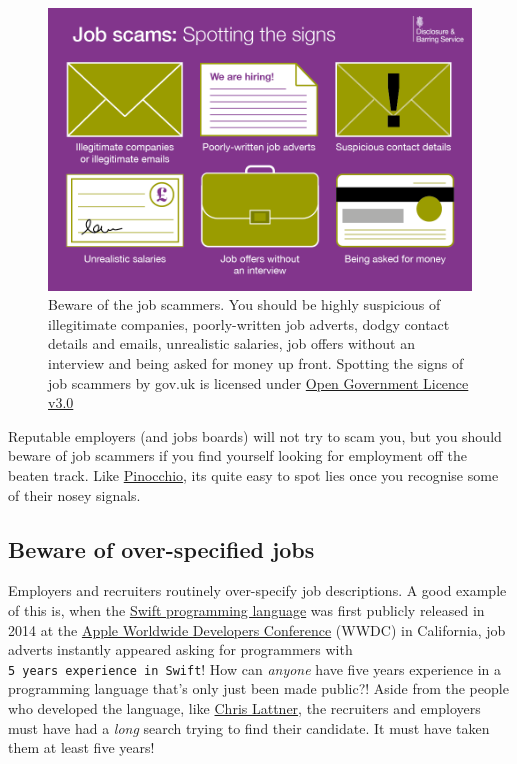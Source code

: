 \documentclass[
]{book}
\begin{document}
\begin{figure}

{\centering \includegraphics[width=0.98\linewidth]{images/Job-Scams-Signs-GOVUK} 

}

\caption{Beware of the job scammers. You should be highly suspicious of illegitimate companies, poorly-written job adverts, dodgy contact details and emails, unrealistic salaries, job offers without an interview and being asked for money up front. Spotting the signs of job scammers by gov.uk is licensed under \href{https://www.nationalarchives.gov.uk/doc/open-government-licence/version/3/}{Open Government Licence v3.0} \citep{jobscammers2}}\label{fig:jobscams-fig}
\end{figure}



Reputable employers (and jobs boards) will not try to scam you, but you should beware of job scammers if you find yourself looking for employment off the beaten track. Like \href{https://en.wikipedia.org/wiki/Pinocchio}{Pinocchio}, its quite easy to spot lies once you recognise some of their nosey signals. 🤥

\hypertarget{overspec}{%
\subsection{Beware of over-specified jobs}\label{overspec}}

Employers and recruiters routinely over-specify job descriptions. A good example of this is, when the \href{https://en.wikipedia.org/wiki/Swift_(programming_language)}{Swift programming language} was first publicly released in 2014 at the \href{https://en.wikipedia.org/wiki/Apple_Worldwide_Developers_Conference}{Apple Worldwide Developers Conference} (WWDC) in California, job adverts instantly appeared asking for programmers with \texttt{5\ years\ experience\ in\ Swift}! How can \emph{anyone} have five years experience in a programming language that's only just been made public?! Aside from the people who developed the language, like \href{https://en.wikipedia.org/wiki/Chris_Lattner}{Chris Lattner}, the recruiters and employers must have had a \emph{long} search trying to find their candidate. It must have taken them at least five years!
\end{document}
